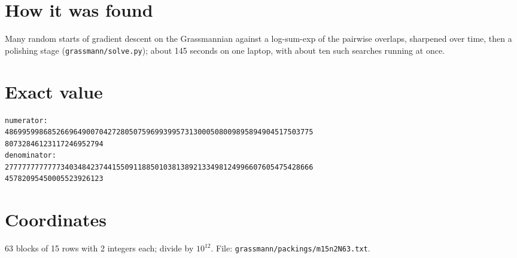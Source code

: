 \documentclass[11pt,a4paper]{article}
\begin{document}
\section{How it was found}
Many random starts of gradient descent on the Grassmannian against a log-sum-exp of the pairwise overlaps, sharpened over time, then a polishing stage (\texttt{grassmann/solve.py}); about 145 seconds on one laptop, with about ten such searches running at once.


\appendix
\section{Exact value}
{\small
\begin{verbatim}
numerator:
486995998685266964900704272805075969939957313000508009895894904517503775
80732846123117246952794
denominator:
277777777777734034842374415509118850103813892133498124996607605475428666
45782095450005523926123
\end{verbatim}}

\section{Coordinates}
63 blocks of 15 rows with 2 integers each; divide by $10^{12}$. File: \texttt{grassmann/packings/m15n2N63.txt}.
{\tiny
\begin{multicols}{4}
\end{multicols}}
\end{document}

